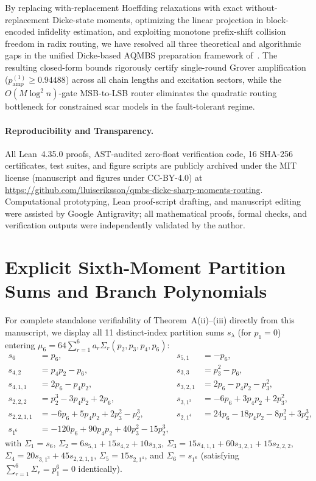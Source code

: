 \documentclass[11pt,a4paper]{article}
\theoremstyle{remark}
\begin{document}
By replacing with-replacement Hoeffding relaxations with exact without-replacement Dicke-state moments, optimizing the linear projection in block-encoded infidelity estimation, and exploiting monotone prefix-shift collision freedom in radix routing, we have resolved all three theoretical and algorithmic gaps in the unified Dicke-based AQMBS preparation framework of~\cite{AKN26}. The resulting closed-form bounds rigorously certify single-round Grover amplification ($p_{\mathrm{amp}}^{(1)} \ge 0.94488$) across all chain lengths and excitation sectors, while the $O(M \log^2 n)$-gate MSB-to-LSB router eliminates the quadratic routing bottleneck for constrained scar models in the fault-tolerant regime.

\paragraph{Reproducibility and Transparency.}
All Lean~4.35.0 proofs, AST-audited zero-float verification code, 16 SHA-256 certificates, test suites, and figure scripts are publicly archived under the MIT license (manuscript and figures under CC-BY-4.0) at \url{https://github.com/lluiseriksson/qmbs-dicke-sharp-moments-routing}. Computational prototyping, Lean proof-script drafting, and manuscript editing were assisted by Google Antigravity; all mathematical proofs, formal checks, and verification outputs were independently validated by the author.




\appendix
\section{Explicit Sixth-Moment Partition Sums and Branch Polynomials}
\label{app:mu6}

For complete standalone verifiability of Theorem~A(ii)--(iii) directly from this manuscript, we display all 11 distinct-index partition sums $s_\lambda$ (for $p_1 = 0$) entering $\mu_6 = 64\sum_{r=1}^6 a_r \Sigma_r(p_2, p_3, p_4, p_6)$:
\begin{align*}
s_6 &= p_6, & s_{5,1} &= -p_6, \\
s_{4,2} &= p_4 p_2 - p_6, & s_{3,3} &= p_3^2 - p_6, \\
s_{4,1,1} &= 2p_6 - p_4 p_2, & s_{3,2,1} &= 2p_6 - p_4 p_2 - p_3^2, \\
s_{2,2,2} &= p_2^3 - 3p_4 p_2 + 2p_6, & s_{3,1^3} &= -6p_6 + 3p_4 p_2 + 2p_3^2, \\
s_{2,2,1,1} &= -6p_6 + 5p_4 p_2 + 2p_3^2 - p_2^3, & s_{2,1^4} &= 24p_6 - 18p_4 p_2 - 8p_3^2 + 3p_2^3, \\
s_{1^6} &= -120p_6 + 90p_4 p_2 + 40p_3^2 - 15p_2^3, & &
\end{align*}
with $\Sigma_1 = s_6$, $\Sigma_2 = 6s_{5,1} + 15s_{4,2} + 10s_{3,3}$, $\Sigma_3 = 15s_{4,1,1} + 60s_{3,2,1} + 15s_{2,2,2}$, $\Sigma_4 = 20s_{3,1^3} + 45s_{2,2,1,1}$, $\Sigma_5 = 15s_{2,1^4}$, and $\Sigma_6 = s_{1^6}$ (satisfying $\sum_{r=1}^6 \Sigma_r = p_1^6 = 0$ identically).
\end{document}
